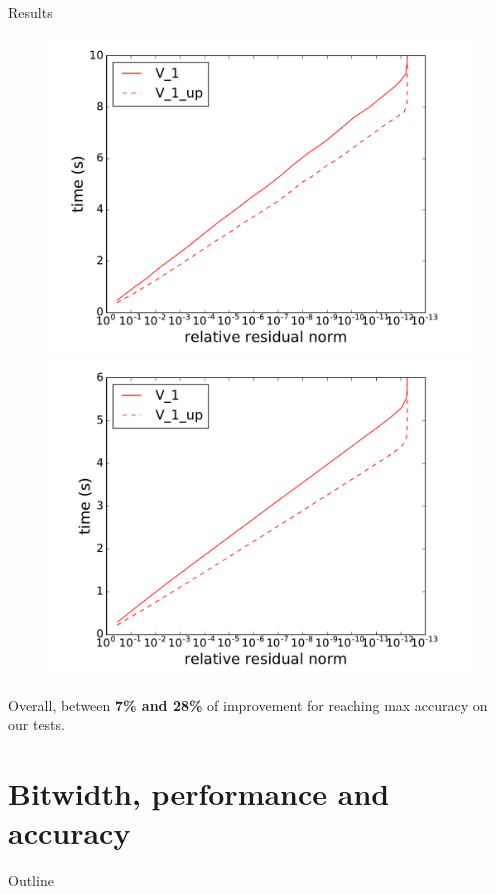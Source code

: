 \documentclass[hyperref={pdfpagelabels=false}]{beamer}
\begin{document}
\begin{frame}{Results}
{\begin{figure}
        \includegraphics[width=0.33\linewidth]{../ICS/figs/mt_36.pdf}
        \includegraphics[width=0.33\linewidth]{../ICS/figs/mt_64.pdf}
    \end{figure}

 Overall, between \textbf{7\% and 28\%} of improvement for reaching max accuracy on our tests.
    }


\end{frame}


\section{Bitwidth, performance and accuracy}

\begin{frame}{Outline}
 \tableofcontents[currentsection]
\end{frame}
\end{document}
